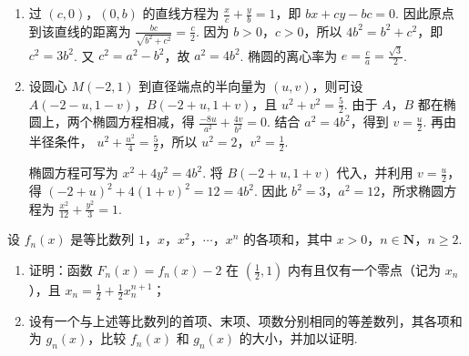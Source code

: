 \begin{solution}
\begin{enumerate}
\item 过 \((c,0)\)，\((0,b)\) 的直线方程为
\(\frac{x}{c}+\frac{y}{b}=1\)，即 \(bx+cy-bc=0\). 因此原点到该直线的距离为
\(\frac{bc}{\sqrt{b^{2}+c^{2}}}=\frac{c}{2}\).
因为 \(b>0\)，\(c>0\)，所以 \(4b^{2}=b^{2}+c^{2}\)，即 \(c^{2}=3b^{2}\). 又 \(c^{2}=a^{2}-b^{2}\)，故 \(a^{2}=4b^{2}\). 椭圆的离心率为
\(e=\frac{c}{a}=\frac{\sqrt{3}}{2}\).

\item 设圆心 \(M(-2,1)\) 到直径端点的半向量为 \((u,v)\)，则可设
\(A(-2-u,1-v)\)，\(B(-2+u,1+v)\)，且
\(u^{2}+v^{2}=\frac{5}{2}\).
由于 \(A\)，\(B\) 都在椭圆上，两个椭圆方程相减，得
\(\frac{-8u}{a^{2}}+\frac{4v}{b^{2}}=0\). 结合 \(a^{2}=4b^{2}\)，得到 \(v=\frac{u}{2}\). 再由半径条件，
\(u^{2}+\frac{u^{2}}{4}=\frac{5}{2}\)，所以 \(u^{2}=2\)，\(v^{2}=\frac{1}{2}\).

椭圆方程可写为 \(x^{2}+4y^{2}=4b^{2}\). 将 \(B(-2+u,1+v)\) 代入，并利用 \(v=\frac{u}{2}\)，得
\((-2+u)^{2}+4(1+v)^{2}=12=4b^{2}\).
因此 \(b^{2}=3\)，\(a^{2}=12\)，所求椭圆方程为
\(\frac{x^{2}}{12}+\frac{y^{2}}{3}=1\).
\end{enumerate}
\end{solution}

\begin{problem}
设 \( f_{n}(x) \) 是等比数列 \(1\)，\(x\)，\(x^{2}\)，\(\cdots\)，\(x^{n}\) 的各项和，其中 \(x > 0\)，\(n \in \mathbf{N}\)，\( n \geqslant 2 \).

\begin{enumerate}
\item 证明：函数 \(F_{n}(x) = f_{n}(x) - 2\) 在 \(\left(\frac{1}{2}, 1\right)\) 内有且仅有一个零点（记为 \(x_{n}\)），且 \(x_{n} = \frac{1}{2} + \frac{1}{2}x_{n}^{n+1}\)；
\item 设有一个与上述等比数列的首项、末项、项数分别相同的等差数列，其各项和为 \(g_{n}(x)\)，比较 \(f_{n}(x)\) 和 \(g_{n}(x)\) 的大小，并加以证明.
\end{enumerate}
\end{problem}

